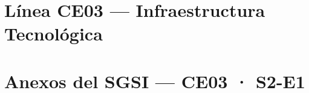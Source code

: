 \documentclass[12pt,a4paper]{report}
\begin{document}
\part{Línea CE03 — Infraestructura Tecnológica}

\appendix
\part{Anexos del SGSI — CE03 · S2-E1}

\end{document}
